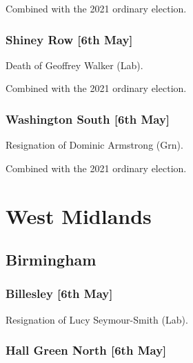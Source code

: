 \documentclass[a4paper,openany]{book}
\begin{document}
\begin{resultsiii}
Combined with the 2021 ordinary election.

\subsubsection*{Shiney Row \hspace*{\fill}\nolinebreak[1]%
	\enspace\hspace*{\fill}
	[6th May]}


Death of Geoffrey Walker (Lab).

Combined with the 2021 ordinary election.

\subsubsection*{Washington South \hspace*{\fill}\nolinebreak[1]%
	\enspace\hspace*{\fill}
	[6th May]}


Resignation of Dominic Armstrong (Grn).

Combined with the 2021 ordinary election.

\section{West Midlands}

\subsection*{Birmingham}

\subsubsection*{Billesley \hspace*{\fill}\nolinebreak[1]%
	\enspace\hspace*{\fill}
	[6th May]}


Resignation of Lucy Seymour-Smith (Lab).

\subsubsection*{Hall Green North \hspace*{\fill}\nolinebreak[1]%
	\enspace\hspace*{\fill}
	[6th May]}


\end{resultsiii}
\end{document}
